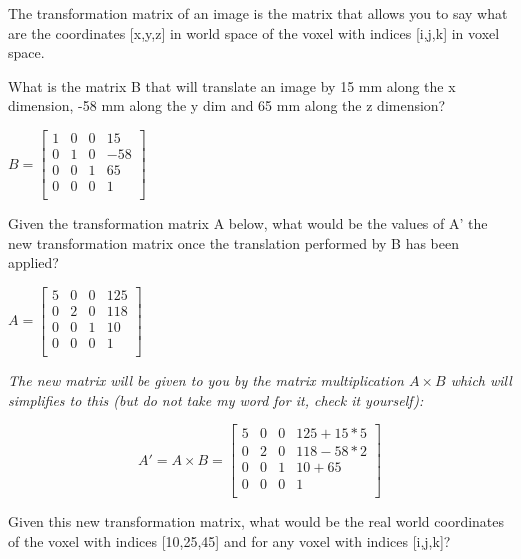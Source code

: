 \documentclass[a4paper,10pt]{article}
\begin{document}
The transformation matrix of an image is the matrix that allows you to say what are the coordinates [x,y,z] in world space of the voxel with indices [i,j,k] in voxel space.

What is the matrix B that will translate an image by 15 mm along the x dimension, -58 mm along the y dim and 65 mm along the z dimension?

\bigskip
$ B =
\left[\begin{array}{cccc}
  1 	& 0 	& 0 	& 15\\ 
  0 	& 1	& 0 	& -58\\
  0 	& 0 	& 1 	& 65\\
  0 	& 0 	& 0 	& 1\\
\end{array}\right] 
$
\bigskip

Given the transformation matrix A below, what would be the values of A' the new transformation matrix once the translation performed by B has been applied?

\bigskip
$ A =
\left[\begin{array}{cccc}
  5 	& 0 	& 0 	& 125\\ 
  0 	& 2 	& 0 	& 118\\
  0 	& 0 	& 1 	& 10\\
  0 	& 0 	& 0 	& 1\\
\end{array}\right] 
$

\bigskip
\textit{The new matrix will be given to you by the matrix multiplication $A \times B$ which will simplifies to this (but do not take my word for it, check it yourself):}

\begin{displaymath}
A' = A \times B =
\left[\begin{array}{cccc}
  5 	& 0 	& 0 	& 125+15*5\\ 
  0 	& 2 	& 0 	& 118-58*2\\
  0 	& 0 	& 1 	& 10+65\\
  0 	& 0 	& 0 	& 1\\
\end{array}\right]
\end{displaymath}

\bigskip
Given this new transformation matrix, what would be the real world coordinates of the voxel with indices [10,25,45] and for any voxel with indices [i,j,k]?
\end{document}
